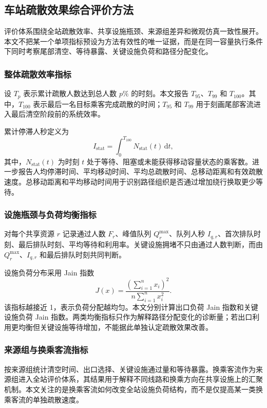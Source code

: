 \documentclass[UTF8,a4paper,12pt]{ctexart}
\begin{document}
\subsection{车站疏散效果综合评价方法}

评价体系围绕全站疏散效率、共享设施瓶颈、来源组差异和微观仿真一致性展开。本文不把某一个单项指标预设为方法有效性的唯一证据，而是在同一容量执行条件下同时考察尾部清空、等待暴露、关键设施负荷和路径分配变化。

\subsubsection{整体疏散效率指标}

设 \(T_p\) 表示累计疏散人数达到总人数 \(p\%\) 的时刻。本文报告 \(T_{95}\)、\(T_{99}\) 和 \(T_{100}\)。其中，\(T_{100}\) 表示最后一名目标乘客完成疏散的时间；\(T_{95}\) 和 \(T_{99}\) 用于刻画尾部客流进入最后清空阶段前的系统效率。

累计停滞人秒定义为
\[
I_{\mathrm{stat}}=\int_0^{T_{100}}N_{\mathrm{stat}}(t)\,\mathrm{d}t,
\]
其中，\(N_{\mathrm{stat}}(t)\) 为时刻 \(t\) 处于等待、阻塞或未能获得移动容量状态的乘客数。进一步报告人均停滞时间、平均移动时间、平均总疏散时间、总移动距离和有效疏散速度。总移动距离和平均移动时间用于识别路径组织是否通过增加绕行换取更少等待。

\subsubsection{设施瓶颈与负荷均衡指标}

对每个共享资源 \(r\) 记录通过人数 \(F_r\)、峰值队列 \(Q^{\max}_r\)、队列人秒 \(I_{q,r}\)、首次排队时刻、最后排队时刻、平均等待和利用率。关键设施拥堵不只由通过人数判断，而由 \(Q^{\max}_r\)、\(I_{q,r}\) 和最后排队时刻共同判断。

设施负荷分布采用 Jain 指数
\[
J(x)=\frac{(\sum_{i=1}^{n}x_i)^2}{n\sum_{i=1}^{n}x_i^2}.
\]
该指标越接近 1，表示负荷分配越均匀。本文分别计算出口负荷 Jain 指数和关键设施负荷 Jain 指数。两类均衡指标只作为解释路径分配变化的诊断量；若出口利用更均衡但关键设施等待增加，不能据此单独认定疏散效果改善。

\subsubsection{来源组与换乘客流指标}

按来源组统计清空时间、出口选择、关键设施通过量和等待暴露。换乘客流作为来源组进入全站评价体系，其结果用于解释不同线路和换乘方向在共享设施上的汇聚机制。本文关注的是换乘客流如何改变全站设施负荷结构，而不是仅提高某一类换乘客流的单独疏散速度。
\end{document}
